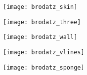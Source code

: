 \begin{figure}[!ht]
    \centering
    \begin{subfigure}[b]{0.19\textwidth}
        \texttt{[image: brodatz\_skin]}
        \caption{}
    \end{subfigure}
    \begin{subfigure}[b]{0.19\textwidth}
        \texttt{[image: brodatz\_three]}
        \caption{}
    \end{subfigure} 
    \begin{subfigure}[b]{0.19\textwidth}
        \texttt{[image: brodatz\_wall]}
        \caption{}
    \end{subfigure}
    \begin{subfigure}[b]{0.19\textwidth}
        \texttt{[image: brodatz\_vlines]}
        \caption{}
    \end{subfigure}
    \begin{subfigure}[b]{0.19\textwidth}
        \texttt{[image: brodatz\_sponge]}
        \caption{}
    \end{subfigure}\\
    

\end{figure}

